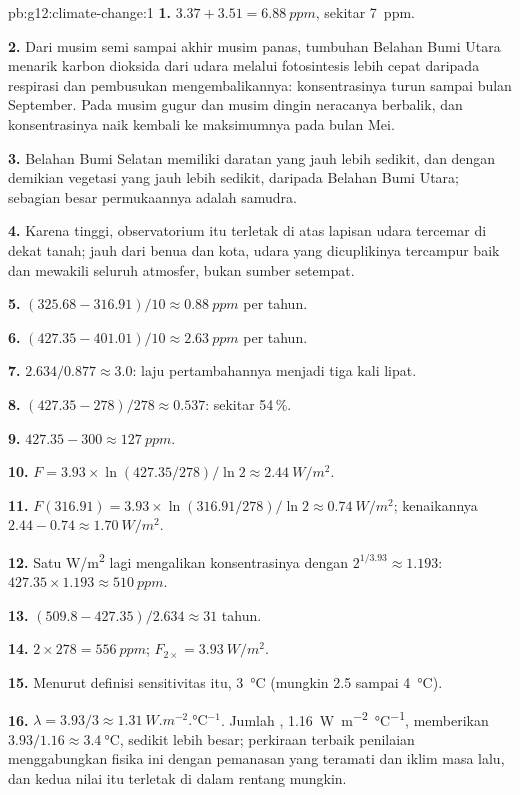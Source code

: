 \begin{solution}{pb:g12:climate-change:1}
\textbf{1.} $3.37 + 3.51 = \qty{6.88}{ppm}$, sekitar \qty{7}{ppm}.

\textbf{2.} Dari musim semi sampai akhir musim panas, tumbuhan Belahan Bumi
Utara menarik karbon dioksida dari udara melalui fotosintesis lebih cepat
daripada respirasi dan pembusukan mengembalikannya: konsentrasinya turun
sampai bulan September. Pada musim gugur dan musim dingin neracanya berbalik,
dan konsentrasinya naik kembali ke maksimumnya pada bulan Mei.

\textbf{3.} Belahan Bumi Selatan memiliki daratan yang jauh lebih sedikit, dan
dengan demikian vegetasi yang jauh lebih sedikit, daripada Belahan Bumi Utara;
sebagian besar permukaannya adalah samudra.

\textbf{4.} Karena tinggi, observatorium itu terletak di atas lapisan udara
tercemar di dekat tanah; jauh dari benua dan kota, udara yang dicuplikinya
tercampur baik dan mewakili seluruh atmosfer, bukan sumber setempat.

\textbf{5.} $(325.68 - 316.91)/10 \approx \qty{0.88}{ppm}$ per tahun.

\textbf{6.} $(427.35 - 401.01)/10 \approx \qty{2.63}{ppm}$ per tahun.

\textbf{7.} $2.634/0.877 \approx 3.0$: laju pertambahannya menjadi tiga kali
lipat.

\textbf{8.} $(427.35 - 278)/278 \approx 0.537$: sekitar 54\,\%.

\textbf{9.} $427.35 - 300 \approx \qty{127}{ppm}$.

\textbf{10.} $F = 3.93 \times \ln(427.35/278)/\ln 2 \approx
\qty{2.44}{W/m^2}$.

\textbf{11.} $F(316.91) = 3.93 \times \ln(316.91/278)/\ln 2 \approx
\qty{0.74}{W/m^2}$; kenaikannya $2.44 - 0.74 \approx \qty{1.70}{W/m^2}$.

\textbf{12.} Satu \unit{W/m^2} lagi mengalikan konsentrasinya dengan
$2^{1/3.93} \approx 1.193$: $427.35 \times 1.193 \approx \qty{510}{ppm}$.

\textbf{13.} $(509.8 - 427.35)/2.634 \approx 31$ tahun.

\textbf{14.} $2 \times 278 = \qty{556}{ppm}$;  $F_{2\times} =
\qty{3.93}{W/m^2}$.

\textbf{15.} Menurut definisi sensitivitas itu, \qty{3}{\degreeCelsius}
(mungkin 2.5 sampai \qty{4}{\degreeCelsius}).

\textbf{16.} $\lambda = 3.93/3 \approx \qty{1.31}{W.m^{-2}.\degreeCelsius^{-1}}$.
Jumlah , \qty{1.16}{W.m^{-2}.\degreeCelsius^{-1}}, memberikan
$3.93/1.16 \approx \qty{3.4}{\degreeCelsius}$, sedikit lebih besar; perkiraan
terbaik penilaian menggabungkan fisika ini dengan pemanasan yang teramati dan
iklim masa lalu, dan kedua nilai itu terletak di dalam rentang mungkin.


\end{solution}
